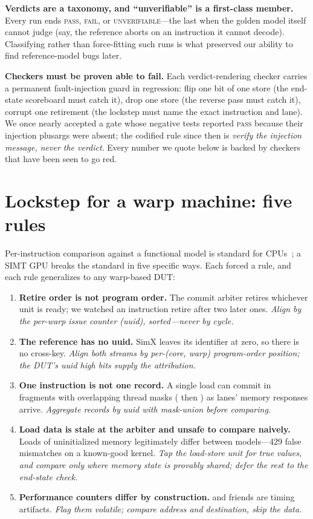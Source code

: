 \documentclass[conference]{IEEEtran}
\newcommand{\code}[1]{\texttt{\detokenize{#1}}}
\begin{document}
\textbf{Verdicts are a taxonomy, and ``unverifiable'' is a
	first-class member.} Every run ends \textsc{pass},
\textsc{fail}, or \textsc{unverifiable}---the last when the golden
model itself cannot judge (say, the reference aborts on an
instruction it cannot decode). Classifying rather than force-fitting
such runs is what preserved our ability to find reference-model bugs
later.

\textbf{Checkers must be proven able to fail.} Each verdict-rendering
checker carries a permanent fault-injection guard in regression:
flip one bit of one store (the end-state scoreboard must catch it),
drop one store (the reverse pass must catch it), corrupt one
retirement (the lockstep must name the exact instruction and lane).
We once nearly accepted a gate whose negative tests reported
\textsc{pass} because their injection plusargs were absent; the
codified rule since then is \emph{verify the injection message, never
	the verdict}. Every number we quote below is backed by checkers that
have been seen to go red.

\section{Lockstep for a warp machine: five rules}
Per-instruction comparison against a functional model is standard for
CPUs~\cite{difftest,imperasdv}; a SIMT GPU breaks the standard in
five specific ways. Each forced a rule, and each rule generalizes to
any warp-based DUT:

\begin{enumerate}
	\item \textbf{Retire order is not program order.} The commit arbiter
	      retires whichever unit is ready; we watched an instruction retire
	      after two later ones. \emph{Align by the per-warp issue counter
		      (uuid), sorted---never by cycle.}
	\item \textbf{The reference has no uuid.} SimX leaves its identifier
	      at zero, so there is no cross-key. \emph{Align both streams by
		      per-(core, warp) program-order position; the DUT's uuid high bits
		      supply the attribution.}
	\item \textbf{One instruction is not one record.} A single load can
	      commit in fragments with overlapping thread masks
	      (\code{0xd} then \code{0xe}) as lanes' memory responses arrive.
	      \emph{Aggregate records by uuid with mask-union before comparing.}
	\item \textbf{Load data is stale at the arbiter and unsafe to compare
		      naively.} Loads of uninitialized memory legitimately differ between
	      models---429 false mismatches on a known-good kernel. \emph{Tap the
		      load-store unit for true values, and compare only where memory state
		      is provably shared; defer the rest to the end-state check.}
	\item \textbf{Performance counters differ by construction.}
	      \code{mcycle} and friends are timing artifacts. \emph{Flag them
		      volatile; compare address and destination, skip the data.}
\end{enumerate}
\end{document}
